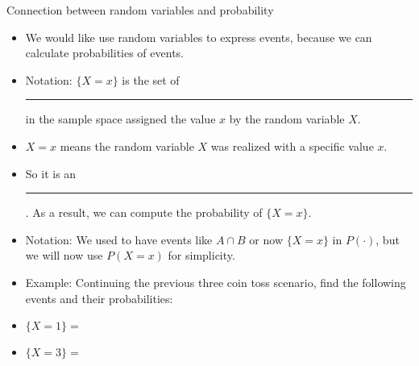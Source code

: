 \documentclass{article}
\newcommand{\blankul}[1]{\rule[-1.5mm]{#1}{0.15mm}}	%
\begin{document}
Connection between random variables and probability\bigskip
\begin{itemize}
    \item We would like use random variables to express events, because we can calculate probabilities of events.
    \item Notation: $\{X = x\}$ is the set of \blankul{2cm} in the sample space assigned the value $x$ by the random variable $X$.
    \item[] $X = x$ means the random variable $X$ was realized with a specific value $x$.
    \item[] So it is an \blankul{2cm}. As a result, we can compute the probability of $\{X = x\}$.    \item Notation: We used to have events like $A \cap B$ or now $\{X = x\}$ in $P(\cdot)$, but we will now use $P(X = x)$ for simplicity.
\bigskip
    \item[] Example: Continuing the previous three coin toss scenario, find the following events and their probabilities:
    \item[] $\{X = 1\} = $\bigskip
    \item[] $\{X = 3\} = $\bigskip
\end{itemize}
\end{document}
